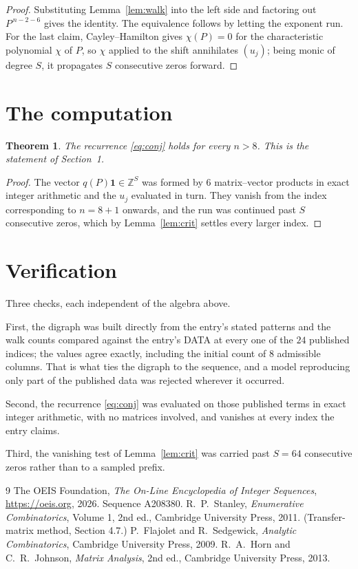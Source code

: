 \documentclass[11pt,a4paper]{article}
\theoremstyle{plain}
\newtheorem{theorem}{Theorem}
\theoremstyle{definition}
\begin{document}
\begin{proof}
Substituting Lemma~\ref{lem:walk} into the left side and factoring out
$P^{\,n-2-6}$ gives the identity. The equivalence follows by letting the exponent
run. For the last claim, Cayley--Hamilton gives $\chi(P)=0$ for the characteristic
polynomial $\chi$ of $P$, so $\chi$ applied to the shift annihilates $(u_j)$; being monic of
degree $S$, it propagates $S$ consecutive zeros forward.
\end{proof}

\section{The computation}

\begin{theorem}
The recurrence \eqref{eq:conj} holds for every $n>8$. This is the statement of
Section~1.
\end{theorem}

\begin{proof}
The vector $q(P)\mathbf{1}\in\mathbb{Z}^{S}$ was formed by $6$ matrix--vector
products in exact integer arithmetic and the $u_j$ evaluated in turn. They vanish from the
index corresponding to $n=8+1$ onwards, and the run was continued past $S$ consecutive
zeros, which by Lemma~\ref{lem:crit} settles every larger index.
\end{proof}

\section{Verification}

Three checks, each independent of the algebra above.

First, the digraph was built directly from the entry's stated patterns and the walk counts
compared against the entry's DATA at every one of the $24$ published indices; the
values agree exactly, including the initial count of $8$ admissible columns. That is
what ties the digraph to the sequence, and a model reproducing only part of the published
data was rejected wherever it occurred.

Second, the recurrence \eqref{eq:conj} was evaluated on those published terms in exact
integer arithmetic, with no matrices involved, and vanishes at every index the entry claims.

Third, the vanishing test of Lemma~\ref{lem:crit} was carried past $S=64$ consecutive
zeros rather than to a sampled prefix.

\begin{thebibliography}{9}
 The OEIS Foundation, \emph{The On-Line Encyclopedia of Integer
Sequences}, \url{https://oeis.org}, 2026. Sequence A208380.
 R.~P.~Stanley, \emph{Enumerative Combinatorics}, Volume 1, 2nd ed.,
Cambridge University Press, 2011. (Transfer-matrix method, Section 4.7.)
 P.~Flajolet and R.~Sedgewick, \emph{Analytic Combinatorics}, Cambridge
University Press, 2009.
 R.~A.~Horn and C.~R.~Johnson, \emph{Matrix Analysis}, 2nd ed., Cambridge
University Press, 2013.
\end{thebibliography}
\end{document}
